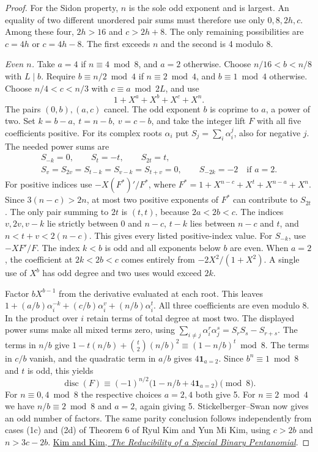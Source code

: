 \documentclass[11pt]{article}
\begin{document}
\begin{proof}
For the Sidon property, \(n\) is the sole odd exponent and is largest.
An equality of two different unordered pair sums must therefore use
only \(0,8,2h,c\). Among these four, \(2h>16\) and \(c>2h+8\).
The only remaining possibilities are \(c=4h\) or \(c=4h-8\).
The first exceeds \(n\) and the second is 4 modulo 8.

\emph{Even \(n\).} Take \(a=4\) if \(n\equiv4\bmod8\), and \(a=2\)
otherwise. Choose \(n/16<b<n/8\) with \(L\mid b\). Require
\(b\equiv n/2\bmod4\) if \(n\equiv2\bmod4\), and \(b\equiv1\bmod4\)
otherwise. Choose \(n/4<c<n/3\) with \(c\equiv a\bmod 2L\), and use
\[
                    1+X^a+X^b+X^c+X^n .
\]
The pairs \((0,b),(a,c)\) cancel. The odd exponent \(b\) is coprime
to \(a\), a power of two. Set \(k=b-a,\ t=n-b,\ v=c-b\), and take the
integer lift \(F\) with all five coefficients positive. For its complex
roots \(\alpha_i\) put \(S_j=\sum_i\alpha_i^j\), also for negative \(j\).
The needed power sums are
\[
\begin{gathered}
 S_{-k}=0,\qquad S_t=-t,\qquad S_{2t}=t,\\
 S_v=S_{2v}=S_{t-k}=S_{v-k}=S_{t+v}=0,\qquad
 S_{-2k}=-2\quad\text{if }a=2 .
\end{gathered}
\]
For positive indices use \(-X(F^*)'/F^*\), where
\(F^*=1+X^{n-c}+X^t+X^{n-a}+X^n\).
Since \(3(n-c)>2n\), at most two positive exponents of \(F^*\) can
contribute to \(S_{2t}\). The only pair summing to \(2t\) is \((t,t)\),
because \(2a<2b<c\). The indices \(v,2v,v-k\) lie strictly between
0 and \(n-c\), \(t-k\) lies between \(n-c\) and \(t\), and
\(n<t+v<2(n-c)\). This gives every listed positive-index value.
For \(S_{-k}\), use \(-XF'/F\). The index \(k<b\) is odd and all exponents below
\(b\) are even. When \(a=2\), the coefficient at \(2k<2b<c\) comes
entirely from \(-2X^2/(1+X^2)\). A single use of \(X^b\) has odd
degree and two uses would exceed \(2k\).

Factor \(bX^{b-1}\) from the derivative evaluated at each root. This
leaves \(1+(a/b)\alpha_i^{-k}+(c/b)\alpha_i^v+(n/b)\alpha_i^t\).
All three coefficients are even modulo 8. In the product over \(i\)
retain terms of total degree at most two. The displayed power sums
make all mixed terms zero, using
\(\sum_{i\ne j}\alpha_i^r\alpha_j^s=S_rS_s-S_{r+s}\).
The terms in \(n/b\) give \(1-t(n/b)+\binom t2(n/b)^2
\equiv(1-n/b)^t\bmod8\). The terms in \(c/b\) vanish, and the
quadratic term in \(a/b\) gives \(4\mathbf1_{a=2}\).
Since \(b^n\equiv1\bmod8\) and \(t\) is odd, this yields
\[
 \operatorname{disc}(F)\equiv
 (-1)^{n/2}\bigl(1-n/b+4\mathbf1_{a=2}\bigr)\pmod8 .
\]
For \(n\equiv0,4\bmod8\) the respective choices \(a=2,4\) both give 5.
For \(n\equiv2\bmod4\) we have \(n/b\equiv2\bmod8\) and \(a=2\),
again giving 5. Stickelberger--Swan now gives an odd number of factors.
The same parity conclusion follows independently from cases (1c) and
(2d) of Theorem 6 of Ryul Kim and Yun Mi Kim, using \(c>2b\) and
\(n>3c-2b\).
\href{https://doi.org/10.1155/2014/482837}{Kim and Kim,
\emph{The Reducibility of a Special Binary Pentanomial}}.


\end{proof}
\end{document}
